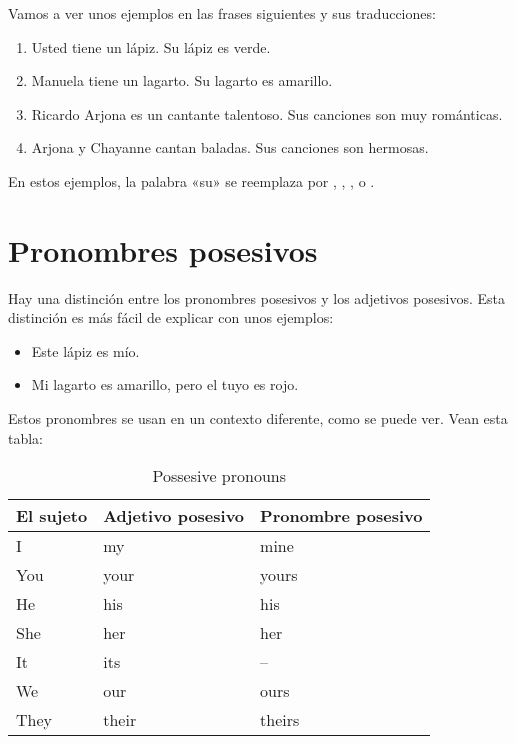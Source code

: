 Vamos a ver unos ejemplos en las frases siguientes y sus traducciones:

\begin{enumerate}
	\item Usted tiene un lápiz. Su l\'apiz es verde.
		\arr {}
	\item Manuela tiene un lagarto. Su lagarto es amarillo.
		\arr {}
	\item Ricardo Arjona es un cantante talentoso. Sus canciones son muy rom\'anticas.
		\arr {}
	\item Arjona y Chayanne cantan baladas. Sus canciones son hermosas.
		\arr {}
\end{enumerate}

En estos ejemplos, la palabra «su» se reemplaza
por , , , o .

\section{Pronombres posesivos}

Hay una distinci\'on entre los pronombres posesivos y los adjetivos posesivos.
Esta distinci\'on es m\'as f\'acil de explicar con unos ejemplos:

\begin{itemize}
	\item Este l\'apiz es m\'io.
		\arr {}
	\item Mi lagarto es amarillo, pero el tuyo es rojo.
		\arr {}
\end{itemize}

Estos pronombres se usan en un contexto diferente, como se puede ver.
Vean esta tabla:

\begin{table}[H]
	\centering
	\begin{tabular}{lll}
	\toprule
	\textbf{El sujeto} & \textbf{Adjetivo posesivo} & \textbf{Pronombre posesivo} \\
	\midrule
	I & my & mine \\
	You & your & yours \\
	He & his & his \\
	She & her & her \\
	It & its & -- \\
	We & our & ours\\
	They & their & theirs \\
	\bottomrule
	\end{tabular}
	\caption{Possesive pronouns}
\end{table}

